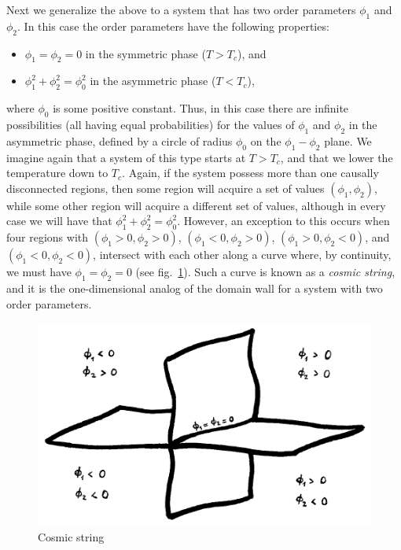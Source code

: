 \documentclass[11pt, a4paper,oneside,openright]{book}
\numberwithin{equation}{section}
\begin{document}
Next we generalize the above to a system that has two order parameters $\phi_1$ and $\phi_2$. In this case the order parameters have the following properties:
\begin{itemize}
\item [] $\phi_1=\phi_2=0$ in the symmetric phase ($T>T_c$), and
\item [] $\phi_1^2+\phi_2^2=\phi_0^2$ in the asymmetric phase ($T<T_c$),
\end{itemize}
where $\phi_0$ is some positive constant. Thus, in this case there are infinite possibilities (all having equal probabilities) for the values of $\phi_1$ and $\phi_2$ in the asymmetric phase, defined by a circle of radius $\phi_0$ on the $\phi_1-\phi_2$ plane. We imagine again that a system of this type starts at $T>T_c$, and that we lower the temperature down to $T_c$. Again, if the system possess more than one causally disconnected regions, then some region will acquire a set of values $(\phi_1,\phi_2)$, while some other region will acquire a different set of values, although in every case we will have that $\phi_1^2+\phi_2^2=\phi_0^2$. However, an exception to this occurs when four regions with $(\phi_1>0,\phi_2>0)$, $(\phi_1<0,\phi_2>0)$, $(\phi_1>0,\phi_2<0)$, and $(\phi_1<0,\phi_2<0)$, intersect with each other along a curve where, by continuity, we must have $\phi_1=\phi_2=0$ (see fig.\ \ref{fig:lec12_8}). Such a curve is known as a {\it cosmic string}, and it is the one-dimensional analog of the 
domain wall for a system with two order parameters.
\begin{figure}[ht]
\begin{center}
\includegraphics[scale=0.6]{Draw/lec12_8.png}
\end{center}
\caption{Cosmic string}
\label{fig:lec12_8}
\end{figure}
\end{document}
